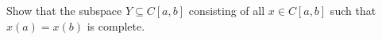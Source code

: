 Show that the subspace $Y\subseteq C[a,b]$ consisting of all $x\in C[a,b]$ such that $x(a)=x(b)$ is
complete.\\

